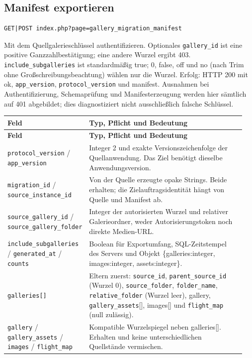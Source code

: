 \documentclass[11pt,a4paper]{article}
\newcommand{\codeword}[1]{\nolinkurl{#1}}
\begin{document}
\subsection{\texorpdfstring{Manifest exportieren}{Manifest exportieren}}

\label{api352:migration-manifest}

\begin{lstlisting}[language={}]
GET|POST index.php?page=gallery_migration_manifest
\end{lstlisting}

Mit dem Quellgalerieschlüssel authentifizieren. Optionales \codeword{gallery_id} ist eine
positive Ganzzahlbestätigung; eine andere Wurzel ergibt 403. \codeword{include_subgalleries}
ist standardmäßig true; 0, false, off und no (nach Trim ohne Großschreibungsbeachtung)
wählen nur die Wurzel. Erfolg: HTTP 200 mit ok, \codeword{app_version},
\codeword{protocol_version} und manifest. Ausnahmen bei Authentifizierung, Schemaprüfung und
Manifesterzeugung werden hier sämtlich auf 401 abgebildet; dies diagnostiziert nicht
ausschließlich falsche Schlüssel.

\begin{longtable}{@{}>{\RaggedRight\arraybackslash}p{0.28\linewidth}>{\RaggedRight\arraybackslash}p{0.67\linewidth}@{}}
\toprule
\textbf{Feld} & \textbf{Typ, Pflicht und Bedeutung} \\
\midrule
\endfirsthead
\toprule
\textbf{Feld} & \textbf{Typ, Pflicht und Bedeutung} \\
\midrule
\endhead
\bottomrule
\endfoot
\codeword{protocol_version} / \codeword{app_version} & Integer 2 und exakte
Versionszeichenfolge der Quellanwendung. Das Ziel benötigt dieselbe Anwendungsversion. \\
\codeword{migration_id} / \codeword{source_instance_id} & Von der Quelle erzeugte opake
Strings. Beide erhalten; die Zielauftragsidentität hängt von Quelle und Manifest ab. \\
\codeword{source_gallery_id} / \codeword{source_gallery_folder} & Integer der autorisierten
Wurzel und relativer Galerieordner, weder Autorisierungstoken noch direkte Medien-URL. \\
\codeword{include_subgalleries} / \codeword{generated_at} / \codeword{counts} & Boolean für
Exportumfang, SQL-Zeitstempel des Servers und Objekt \{galleries:integer, images:integer,
assets:integer\}. \\
\codeword{galleries[]} & Eltern zuerst: \codeword{source_id}, \codeword{parent_source_id}
(Wurzel 0), \codeword{source_folder}, \codeword{folder_name}, \codeword{relative_folder}
(Wurzel leer), gallery, \codeword{gallery_assets}[], images[] und \codeword{flight_map}
(null zulässig). \\
\codeword{gallery} / \codeword{gallery_assets} / \codeword{images} / \codeword{flight_map} &
Kompatible Wurzelspiegel neben galleries[]. Erhalten und keine unterschiedlichen Quellstände
vermischen. \\
\end{longtable}
\end{document}
